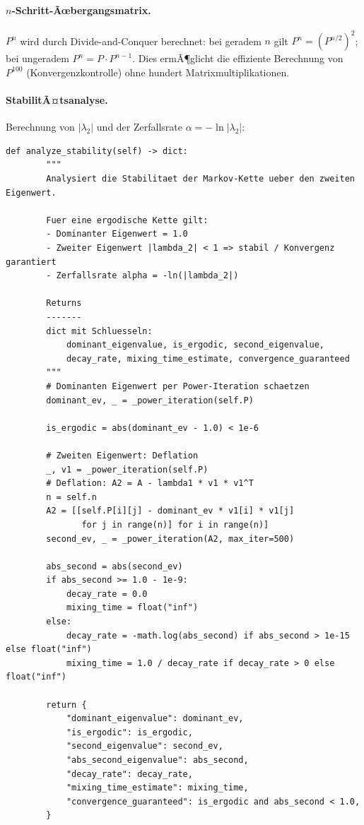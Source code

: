 ﻿\documentclass[a4paper,12pt]{scrreprt}
\theoremstyle{definition}
\begin{document}
\paragraph{$n$-Schritt-Ãœbergangsmatrix.}
$P^n$ wird durch Divide-and-Conquer berechnet: bei geradem $n$ gilt
$P^n = (P^{n/2})^2$; bei ungeradem $P^n = P \cdot P^{n-1}$. Dies ermÃ¶glicht
die effiziente Berechnung von $P^{100}$ (Konvergenzkontrolle) ohne
hundert Matrixmultiplikationen.

\paragraph{StabilitÃ¤tsanalyse.}
Berechnung von $|\lambda_2|$ und der Zerfallsrate $\alpha = -\ln|\lambda_2|$:

\begin{lstlisting}[style=python, caption={StabilitÃ¤tsanalyse: Zerfallsrate und Mixing-Zeit}, label=lst:stability-impl]
def analyze_stability(self) -> dict:
        """
        Analysiert die Stabilitaet der Markov-Kette ueber den zweiten Eigenwert.

        Fuer eine ergodische Kette gilt:
        - Dominanter Eigenwert = 1.0
        - Zweiter Eigenwert |lambda_2| < 1 => stabil / Konvergenz garantiert
        - Zerfallsrate alpha = -ln(|lambda_2|)

        Returns
        -------
        dict mit Schluesseln:
            dominant_eigenvalue, is_ergodic, second_eigenvalue,
            decay_rate, mixing_time_estimate, convergence_guaranteed
        """
        # Dominanten Eigenwert per Power-Iteration schaetzen
        dominant_ev, _ = _power_iteration(self.P)

        is_ergodic = abs(dominant_ev - 1.0) < 1e-6

        # Zweiten Eigenwert: Deflation
        _, v1 = _power_iteration(self.P)
        # Deflation: A2 = A - lambda1 * v1 * v1^T
        n = self.n
        A2 = [[self.P[i][j] - dominant_ev * v1[i] * v1[j]
               for j in range(n)] for i in range(n)]
        second_ev, _ = _power_iteration(A2, max_iter=500)

        abs_second = abs(second_ev)
        if abs_second >= 1.0 - 1e-9:
            decay_rate = 0.0
            mixing_time = float("inf")
        else:
            decay_rate = -math.log(abs_second) if abs_second > 1e-15 else float("inf")
            mixing_time = 1.0 / decay_rate if decay_rate > 0 else float("inf")

        return {
            "dominant_eigenvalue": dominant_ev,
            "is_ergodic": is_ergodic,
            "second_eigenvalue": second_ev,
            "abs_second_eigenvalue": abs_second,
            "decay_rate": decay_rate,
            "mixing_time_estimate": mixing_time,
            "convergence_guaranteed": is_ergodic and abs_second < 1.0,
        }
\end{lstlisting}
\end{document}
